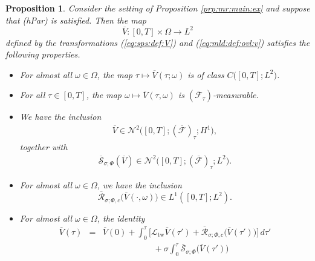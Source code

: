 \documentclass[10pt]{articleHJ}
\newcommand{\sref}[1]{(\ref{#1})}                       %
\newtheorem{prop}[thm]{Proposition}
\numberwithin{equation}{section}
\begin{document}
\begin{prop}
\label{prp:md:props:overline:v}
Consider the setting
of Proposition \ref{prp:mr:main:ex}
and suppose that (hPar) is satisfied.
Then the map
\begin{equation}
\overline{V}: [0, T] \times \Omega \to L^2
\end{equation}
defined by the transformations
\sref{eq:sps:def:V}
and
\sref{eq:mld:def:ovl:v}
satisfies the following properties.
\begin{itemize}
\item[(i)]{
  For almost all $\omega \in \Omega$,
  the map $\tau \mapsto \overline{V}(\tau; \omega)$
  is of class $C\big([0,T]; L^2 \big)$.
}
\item[(ii)]{
  For all $\tau \in [0, T]$, the map
  $\omega \mapsto \overline{V}(\tau,\omega)$
  is $(\overline{\mathcal{F}}_{\tau})$-measurable.
}
\item[(iii)]{
  We have the inclusion
  \begin{equation}
     \begin{array}{lcl}
        \overline{V} \in \mathcal{N}^2\big([0,T];
          (\overline{\mathcal{F}})_{\tau} ; H^1 \big) ,
     \end{array}
  \end{equation}
  together with
  \begin{equation}
     \begin{array}{lcl}
        \overline{\mathcal{S}}_{\sigma;\Phi}(\overline{V})
          \in \mathcal{N}^2\big([0,T];
          (\overline{\mathcal{F}})_{\tau} ; L^2 \big) .
     \end{array}
  \end{equation}
}
\item[(iv)]{
  For almost all $\omega \in \Omega$, we have the inclusion
  \begin{equation}
    \overline{\mathcal{R}}_{\sigma;\Phi, c}\big( \overline{V}(\cdot, \omega) \big)
      \in L^1([0,T]; L^2).
  \end{equation}
}
\item[(v)]{
  For almost all $\omega \in \Omega$, the identity
  \begin{equation}
  \begin{array}{lcl}
    \overline{V}(\tau)
     & = & \overline{V}(0)
     + \int_0^\tau \Big[ \mathcal{L}_{\mathrm{tw}} \overline{V}(\tau')
       +  \overline{\mathcal{R}}_{\sigma;\Phi,c}\big(\overline{V}(\tau')\big)
       \Big]
       \, d \tau'
\\[0.2cm]
& & \qquad \qquad \qquad
     + \sigma \int_0^\tau \overline{\mathcal{S}}_{\sigma;\Phi}\big(\overline{V}(\tau')\big)

\end{array}
\end{equation}}
\end{itemize}
\end{prop}
\end{document}
